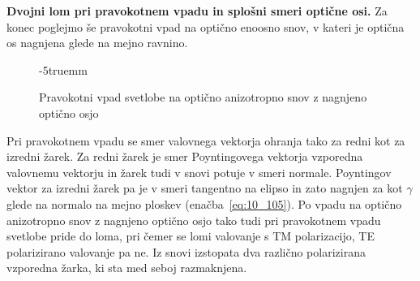 \begin{example}{\bf Dvojni lom pri pravokotnem vpadu in splošni smeri optične osi.}
Za konec poglejmo še pravokotni vpad na optično enoosno snov, v kateri je optična os
nagnjena glede na mejno ravnino. 
\begin{figure}[!ht]
\centering
\def\svgwidth{140truemm} 

\caption{Pravokotni vpad svetlobe na optično anizotropno snov z nagnjeno optično osjo}
\label{fig:10_dvolom_7}
\vglue-5truemm
\end{figure}

Pri pravokotnem vpadu se smer valovnega vektorja ohranja tako za redni kot za izredni 
žarek. Za redni žarek je smer Poyntingovega vektorja vzporedna valovnemu vektorju in 
žarek tudi v snovi potuje v smeri normale. 
Poyntingov vektor za izredni žarek pa je v smeri tangentno na elipso in zato 
nagnjen za kot $\gamma$ glede na normalo na mejno ploskev (enačba~\ref{eq:10_105}). 
Po vpadu na  optično 
anizotropno snov z nagnjeno optično osjo tako tudi pri pravokotnem vpadu svetlobe 
pride do loma, pri čemer se lomi valovanje s TM polarizacijo, TE polarizirano 
valovanje pa ne. Iz snovi izstopata dva različno polarizirana vzporedna žarka, ki sta
med seboj razmaknjena.
\end{example}

